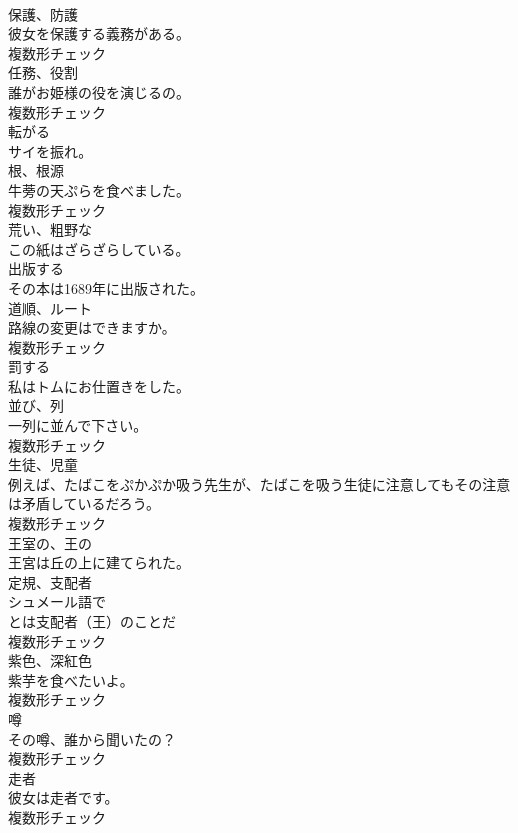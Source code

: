 \documentclass[8pt]{extreport}
\begin{document}
\begin{CJK}{UTF8}{min}
\\	[名詞]	保護、防護	
\\	彼女を保護する義務がある。	
\\	複数形チェック
\\	[名詞]	任務、役割	
\\	誰がお姫様の役を演じるの。	
\\	複数形チェック
\\	[動詞]	転がる	
\\	サイを振れ。	
\\	[名詞]	根、根源	
\\	牛蒡の天ぷらを食べました。	
\\	複数形チェック
\\	[形容詞]	荒い、粗野な	
\\	この紙はざらざらしている。	
\\	[動詞]	出版する	
\\	その本は1689年に出版された。	
\\	[名詞]	道順、ルート	
\\	路線の変更はできますか。	
\\	複数形チェック
\\	[動詞]	罰する	
\\	私はトムにお仕置きをした。	
\\	[名詞]	並び、列	
\\	一列に並んで下さい。	
\\	複数形チェック
\\	[名詞]	生徒、児童	
\\	例えば、たばこをぷかぷか吸う先生が、たばこを吸う生徒に注意してもその注意は矛盾しているだろう。	
\\	複数形チェック
\\	[形容詞]	王室の、王の	
\\	王宮は丘の上に建てられた。	
\\	[名詞]	定規、支配者	
\\	シュメール語で
\\	とは支配者（王）のことだ	
\\	複数形チェック
\\	[名詞]	紫色、深紅色	
\\	紫芋を食べたいよ。	
\\	複数形チェック
\\	[名詞]	噂	
\\	その噂、誰から聞いたの？	
\\	複数形チェック
\\	[名詞]	走者	
\\	彼女は走者です。	
\\	複数形チェック

\end{CJK}
\end{document}
